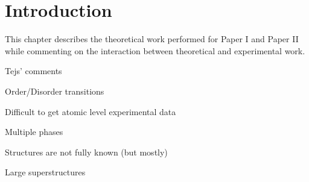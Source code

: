 \section{Introduction}
\label{sec:borohydrides-introduction}

This chapter describes the theoretical work performed for Paper I and Paper II while commenting on the interaction between theoretical and experimental work.

Tejs' comments
\bit
\item Order/Disorder transitions
\item Difficult to get atomic level experimental data
\item Multiple phases
\item Structures are not fully known (but mostly)
\item Large superstructures
\eit

\placeholder

